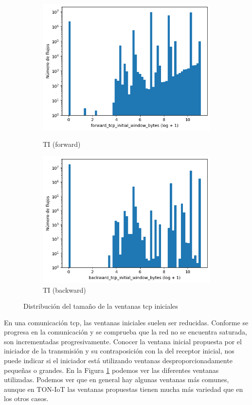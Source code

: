 \begin{figure}[H]
\begin{subfigure}[b]{0.26\textwidth}
        \includegraphics[width=\linewidth]{media/packet_pincer_toniot/forward_tcp_initial_window_bytes_log_x_log_y.png}
        \caption{TI (forward)}
        \includegraphics[width=\linewidth]{media/packet_pincer_toniot/backward_tcp_initial_window_bytes_log_x_log_y.png}
        \caption{TI (backward)}
    \end{subfigure}
       \caption{Distribución del tamaño de la ventanas \acrshort{tcp} iniciales}
       \label{fig:packet_pincer_bidirectional_tcp_initial_window_bytes}
\end{figure}

En una comunicación \acrshort{tcp}, las ventanas iniciales suelen ser reducidas. Conforme se progresa en la comunicación y se comprueba que la red no se encuentra saturada, son incrementadas progresivamente. Conocer la ventana inicial propuesta por el iniciador de la transmisión y su contraposición con la del receptor inicial, nos puede indicar si el iniciador está utilizando ventanas desproporcionadamente pequeñas o grandes. En la Figura \ref{fig:packet_pincer_bidirectional_tcp_initial_window_bytes} podemos ver las diferentes ventanas utilizadas. Podemos ver que en general hay algunas ventanas más comunes, aunque en TON-IoT las ventanas propuestas tienen mucha más variedad que en los otros casos.

